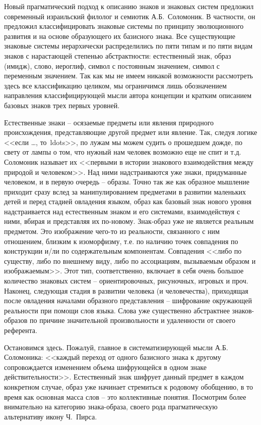 Новый прагматический подход к описанию знаков и знаковых систем предложил
современный израильский филолог и семиотик А.Б.~Соломоник\autocites{solomonik1995}{solomonik2004}{solomonik2009}.
В частности, он предложил классифицировать знаковые системы по принципу
эволюционного развития и на основе образующего их базисного знака.
Все существующие знаковые системы иерархически распределились по пяти типам и
по пяти видам знаков с нарастающей степенью абстрактности: естественный знак,
образ (имидж), слово, иероглиф, символ с постоянным значением, символ с
переменным значением\autocite[][76-86]{solomonik2009}. Так как мы не имеем
никакой возможности рассмотреть здесь все классификацию целиком, мы
ограничимся лишь обозначением направления классифицирующей мысли автора
концепции и кратким описанием  базовых знаков трех первых уровней.

Естественные знаки -- осязаемые предметы или явления природного происхождения,
представляющие другой предмет или явление. Так, следуя логике <<если \ldots, то\ ldots>>,
по лужам мы можем судить о прошедшем дожде, по свету от лампы о том,
что нужный нам человек возможно еще не спит и т.д. Соломоник называет их
<<первыми в истории знакового взаимодействия между природой и человеком>>\autocite[][78]{solomonik2009}.
Над ними надстраиваются уже знаки, придуманные человеком, и в первую очередь --
образы. Точно так же как образное мышление приходит сразу вслед за
манипулированием предметами в развитии маленьких детей и перед стадией
овладения языком, образ как базовый знак нового уровня надстраивается над
естественным знаком и его системами, взаимодействуя с ними, вбирая и представляя
их по-новому. Знак-образ уже не является реальным предметом. Это изображение
чего-то из реальности, связанного с ним отношением, близким к изоморфизму,
т.е. по наличию точек совпадения по конструкции и/ли по содержательным
компонентам. Совпадения <<либо по существу, либо по внешнему виду, либо по
ассоциациям, вызываемым образом и изображаемым>>\autocite[][52]{solomonik1995}.
Этот тип, соответственно, включает в себя очень большое количество
знаковых систем -- ориентировочных, рисуночных, игровых и проч.
Наконец, следующая стадия в развитии человека (и человечества),
приходящая после овладения началами образного представления -- шифрование
окружающей реальности при помощи слов языка. Слова уже существенно абстрактнее
знаков-образов по причине значительной произвольности и удаленности от
своего референта.

Остановимся здесь. Пожалуй, главное в систематизирующей мысли А.Б. Соломоника:
<<каждый переход от одного базисного знака к другому сопровождается изменением
объема шифрующейся в одном знаке действительности>>\autocite[][79]{solomonik2009}.
Естественный знак шифрует данный предмет в каждом конкретном случае, образ
уже начинает стремиться к родовому обобщению, в то время как основная
масса слов -- это коллективные понятия. Посмотрим более внимательно на категорию
знака-образа, своего рода прагматическую альтернативу икону Ч.~Пирса.

